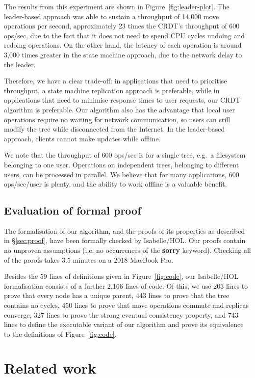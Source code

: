 \documentclass[10pt,journal,compsoc]{IEEEtran}
\begin{document}
The results from this experiment are shown in Figure~\ref{fig:leader-plot}.
The leader-based approach was able to sustain a throughput of 14,000 move operations per second, approximately 23 times the CRDT's throughput of 600 ops/sec, due to the fact that it does not need to spend CPU cycles undoing and redoing operations.
On the other hand, the latency of each operation is around 3,000 times greater in the state machine approach, due to the network delay to the leader.

Therefore, we have a clear trade-off: in applications that need to prioritise throughput, a state machine replication approach is preferable, while in applications that need to minimise response times to user requests, our CRDT algorithm is preferable.
Our algorithm also has the advantage that local user operations require no waiting for network communication, so users can still modify the tree while disconnected from the Internet.
In the leader-based approach, clients cannot make updates while offline.

We note that the throughput of 600 ops/sec is for a single tree, e.g.\ a filesystem belonging to one user.
Operations on independent trees, belonging to different users, can be processed in parallel.
We believe that for many applications, 600 ops/sec/user is plenty, and the ability to work offline is a valuable benefit.

\subsection{Evaluation of formal proof}

The formalisation of our algorithm, and the proofs of its properties as described in \S\ref{sec:proof}, have been formally checked by Isabelle/HOL.
Our proofs contain no unproven assumptions (i.e. no occurrences of the \textbf{sorry} keyword).
Checking all of the proofs takes 3.5 minutes on a 2018 MacBook Pro.

Besides the 59 lines of definitions given in Figure~\ref{fig:code}, our Isabelle/HOL formalisation consists of a further 2,166 lines of code.
Of this, we use 203 lines to prove that every node has a unique parent, 443 lines to prove that the tree contains no cycles, 450 lines to prove that move operations commute and replicas converge, 327 lines to prove the strong eventual consistency property, and 743 lines to define the executable variant of our algorithm and prove its equivalence to the definitions of Figure~\ref{fig:code}.

\section{Related work}\label{sec:relwork}
\end{document}
